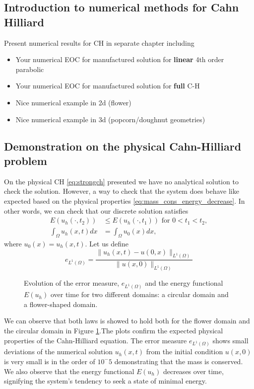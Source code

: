 \subsection{Introduction to numerical methods for Cahn Hilliard}%
\label{sub:introduction_to_numerical_methods_for_cahn_hilliard}

Present numerical results for CH in separate chapter including
\begin{itemize}
    \item Your numerical EOC for  manufactured solution for \textbf{linear} 4th order parabolic
    \item Your numerical EOC for  manufactured solution for \textbf{full} C-H
    \item Nice numerical example in 2d (flower)
    \item Nice numerical example in 3d (popcorn/doughnut geometries)
\end{itemize}


\subsection{Demonstration on the physical Cahn-Hilliard problem}%
\label{sub:demonstration_on_the_physical_cahn_hilliard}

On the physical CH \eqref{eq:strongch} presented we have no analytical solution to check the solution. However, a way to check that the system does behave like expected based on the physical properties \eqref{eq:mass_cons_energy_decrease}. In other
words, we can check that our discrete solution satisfies \[
    \begin{split}
 E( u_{h}( \cdot , t_{2}) ) & \le  E( u_{h}( \cdot , t_{1}) )   \text{ for } 0 < t_{1} < t_{2},  \\
\int_{\Omega }^{} u_{h} ( x,t)  dx & = \int_{\Omega }^{} u_{0}(x)  dx,
    \end{split}
\]
where $u_{0}( x) = u_{h}( x,t) $. Let us define
\[
 e_{L^{1}( \Omega)  } = \frac{\| u_h(x,t)- u(0,x)\|_{L^1(\Omega)}}{\|u(x,0)\|_{L^1(\Omega)}}
\]

\begin{figure}[h!]

\caption{Evolution of the error measure, $e_{L^{1}(\Omega)}$ and the energy functional $E(u_h)$ over time for two different domains: a circular domain and a flower-shaped domain.  }
\label{fig:physical_CH_plot}
\end{figure}

We can observe that both laws is showed to hold both for the flower domain and the circular domain in Figure \ref{fig:physical_CH_plot}.The plots confirm the expected physical properties of the Cahn-Hilliard equation. The error measure
$e_{L^{1}(\Omega)}$ shows small deviations of the numerical solution $u_h(x, t)$ from the initial condition $u(x, 0)$ is very small is in the order of $10^-5$ demonstrating that the mass is conserved. We also observe that the energy functional
$E(u_h)$ decreases over time, signifying the system's tendency to seek a state of minimal energy.




